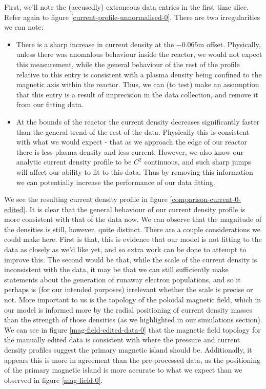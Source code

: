 First, we'll note the (accusedly) extraneous data entries in the first time slice. Refer again 
to figure \ref{current-profile-unnormalised-0}. There are two irregularities we can note:
\begin{itemize}
    \item There is a sharp increase in current density at the $-0.065\text{m}$ offset. Physically, unless 
    there was anomalous behaviour inside the reactor, we would not expect this measurement, while the general 
    behaviour of the rest of the profile relative to this entry is consistent with a plasma density being confined to 
    the magnetic axis within the reactor. Thus, we can (to test) make an assumption that this entry is a result of imprecision in 
    the data collection, and remove it from our fitting data.
    \item At the bounds of the reactor the current density decreases significantly faster than the general trend of the 
    rest of the data. Physically this is consistent with what we would expect - that as we approach the edge of our reactor there is 
    less plasma density and less current. However, we also know our analytic current density profile to be $C^{2}$ continuous, 
    and such sharp jumps will affect our ability to fit to this data. Thus by removing this information we can potentially 
    increase the performance of our data fitting.
\end{itemize}
We see the resulting current density profile in figure \ref{comparison-current-0-edited}. It is clear that the general behaviour 
of our current density profile is more consistent with that of the data now. We can observe that the magnitude of the densities is 
still, however, quite distinct. There are a couple considerations we could make here. First is that, this is evidence that 
our model is not fitting to the data as closely as we'd like yet, and so extra work can be done to attempt to improve this. 
The second would be that, while the scale of the current density is inconsistent with the data, it may be that we can still sufficiently 
make statements about the generation of runaway electron populations, and so it perhaps is (for our intended purposes) irrelevant 
whether the scale is precise or not. More important to us is the topology of the poloidal magnetic field, which in our model is 
informed more by the radial positioning of current density masses than the strength of those densities (as we highlighted in our 
simulations section). We can see in figure \ref{mag-field-edited-data-0} that the magnetic field topology for the manually edited data 
is consistent with where the pressure and current density profiles suggest the primary magnetic island should be. Additionally, it 
appears this is more in agreement than the pre-processed data, as the positioning of the primary magnetic island is more 
accurate to what we expect than we observed in figure \ref{mag-field-0}.

